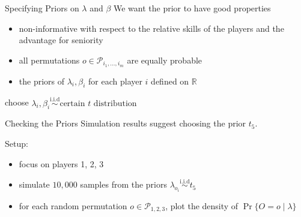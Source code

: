 \begin{frame}{Specifying Priors on $\lambda$ and $\beta$}
    We want the prior to have good properties
    \begin{itemize}
        \item non-informative with respect to the relative skills of the players and the advantage for seniority
        \item all permutations $o \in \mathcal{P}_{i_1, \dots, i_m}$ are equally probable
        \item the priors of $\lambda_i, \beta_i$ for each player $i$ defined on $\mathbb{R}$
    \end{itemize}
    choose $\lambda_i, \beta_i \stackrel{\text{i.i.d}}{\sim}\text{certain $t$ distribution}$
\end{frame}

\begin{frame}{Checking the Priors}
Simulation results suggest choosing the prior $t_5$.

Setup:
\begin{itemize}
    \item focus on players 1, 2, 3
    \item simulate $10,000$ samples from the priors $\lambda_{o_{i}} \stackrel{\text{i.i.d}}{\sim} t_5$
    \item for each random permutation $o \in \mathcal{P}_{1, 2, 3}$, plot the density of $\operatorname{Pr}\{O=o \mid \lambda\}$
\end{itemize}
\end{frame}

